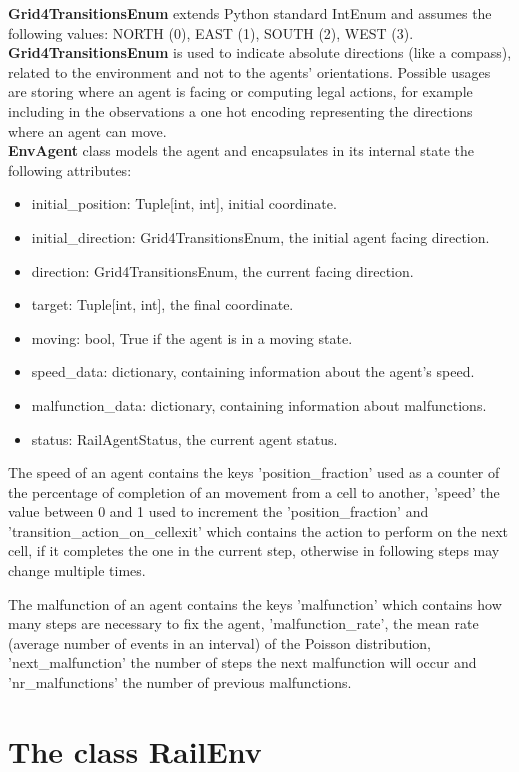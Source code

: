 \documentclass[11pt, a4paper, hidelinks]{report}
\begin{document}
\textbf{Grid4TransitionsEnum} extends Python standard IntEnum and assumes the following values: NORTH (0), EAST (1), SOUTH (2), WEST (3).
\textbf{Grid4TransitionsEnum} is used to indicate absolute directions (like a compass), related to the environment and not to the agents' orientations.
Possible usages are storing where an agent is facing or computing legal actions, for example including in the observations a one hot encoding representing the directions where an agent can move.
\\
\textbf{EnvAgent} class models the agent and encapsulates in its internal state the following attributes:
\begin{itemize}
	\item initial\_position: Tuple[int, int], initial coordinate.
	\item initial\_direction: Grid4TransitionsEnum, the initial agent facing direction.
	\item direction: Grid4TransitionsEnum, the current facing direction.
	\item target: Tuple[int, int], the final coordinate.
	\item moving: bool, True if the agent is in a moving state.
	\item speed\_data: dictionary, containing information about the agent's speed.
	\item malfunction\_data: dictionary, containing information about malfunctions.
	\item status: RailAgentStatus, the current agent status.
\end{itemize}

The speed of an agent contains the keys 'position\_fraction' used as a counter of the percentage of completion of an movement from a cell to another, 'speed' the value between 0 and 1 used to increment the 'position\_fraction' and 'transition\_action\_on\_cellexit' which contains the action to perform on the next cell, if it completes the one in the current step, otherwise in following steps may change multiple times.

The malfunction of an agent contains the keys 'malfunction' which contains how many steps are necessary to fix the agent, 'malfunction\_rate', the mean rate (average number of events in an interval) of the Poisson distribution, 'next\_malfunction' the number of steps the next malfunction will occur and 'nr\_malfunctions' the number of previous malfunctions.

\section{The class RailEnv}\label{sec:the-class-railenv}
\end{document}

